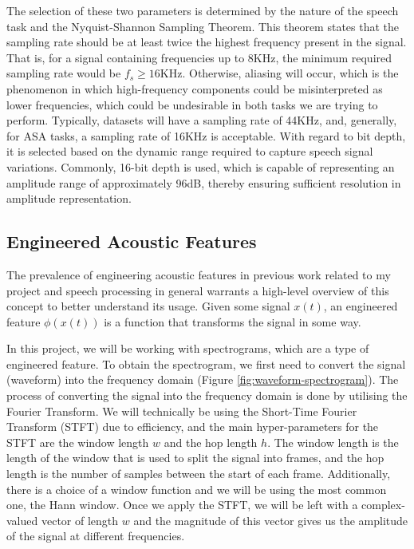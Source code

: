 \documentclass[logo,bsc,singlespacing,parskip,online]{infthesis}
\begin{document}
The selection of these two parameters is determined by the nature of the speech task and the Nyquist-Shannon Sampling Theorem.
This theorem states that the sampling rate should be at least twice the highest frequency present in the signal. 
That is, for a signal containing frequencies up to 8KHz, the minimum required sampling rate would be $f_s \ge 16$KHz.
Otherwise, aliasing will occur, which is the phenomenon in which high-frequency components could be misinterpreted as lower frequencies,
which could be undesirable in both tasks we are trying to perform. Typically, datasets will have a sampling rate 
of 44KHz, and, generally, for ASA tasks, a sampling rate of 16KHz is acceptable. 
With regard to bit depth, it is selected based on the dynamic range required to capture speech signal variations. 
Commonly, 16-bit depth is used, which is capable of representing an amplitude range of approximately 96dB, thereby ensuring sufficient resolution in amplitude representation.

\subsection{Engineered Acoustic Features}
The prevalence of engineering acoustic features in previous work related to my project and speech processing in general
warrants a high-level overview of this concept to better understand its usage. 
Given some signal $x(t)$, an engineered feature $\phi(x(t))$ is a function that transforms the signal in some way.

In this project, we will be working with spectrograms, which are a type of engineered feature.
To obtain the spectrogram, we first need to convert the signal (waveform) into the frequency domain (Figure \ref{fig:waveform-spectrogram}).
The process of converting the signal into the frequency domain is done by utilising 
the Fourier Transform. We will technically be using the Short-Time Fourier Transform (STFT) 
due to efficiency, and the main hyper-parameters for the STFT are the window length $w$ 
and the hop length $h$. The window length is the length of the window that is used to 
split the signal into frames, and the hop length is the number of samples between the 
start of each frame. Additionally, there is a choice of a window function and we will 
be using the most common one, the Hann window. Once we apply the STFT, we will be 
left with a complex-valued vector of length $w$ and the magnitude of this vector 
gives us the amplitude of the signal at different frequencies. 
\end{document}
